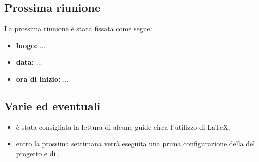 \subsection{Prossima riunione}

La prossima riunione è stata fissata come segue:
\begin{itemize}
	\item \textbf{luogo:} ...
	\item \textbf{data:} ...
	\item \textbf{ora di inizio:} ...
\end{itemize}


\subsection{Varie ed eventuali}

\begin{itemize}

	\item è stata consigliata la lettura di alcune guide circa l'utilizzo di \LaTeX{};
	\item entro la prossima settimana verrà eseguita una prima configurazione della  del progetto e di .
\end{itemize}


